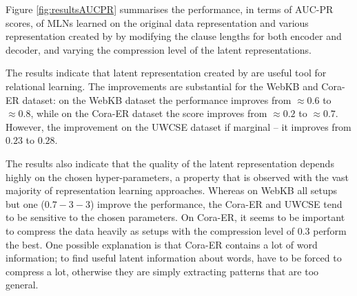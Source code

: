 Figure \ref{fig:resultsAUCPR} summarises the performance, in terms of AUC-PR scores, of MLNs learned on the original data representation and various representation created by  by modifying the clause lengths for both encoder and decoder, and varying the compression level of the latent representations.




The results indicate that latent representation created by  are useful tool for relational learning.
The improvements are substantial for the WebKB and Cora-ER dataset: on the WebKB dataset the performance improves from $\approx 0.6$ to $\approx 0.8$, while on the Cora-ER dataset the score improves from $\approx 0.2$ to $\approx 0.7$.
However, the improvement on the UWCSE dataset if marginal -- it improves from $0.23$ to $0.28$.



The results also indicate that the quality of the latent representation depends highly on the chosen hyper-parameters, a property that is observed with the vast majority of representation learning approaches.
Whereas on WebKB all setups but one ($0.7-3-3$) improve the performance, the Cora-ER and UWCSE tend to be sensitive to the chosen parameters.
On Cora-ER, it seems to be important to compress the data heavily as setups with the compression level of $0.3$ perform the best.
One possible explanation is that Cora-ER contains a lot of word information; to find useful latent information about words,  have to be forced to compress a lot, otherwise they are simply extracting patterns that are too general.

